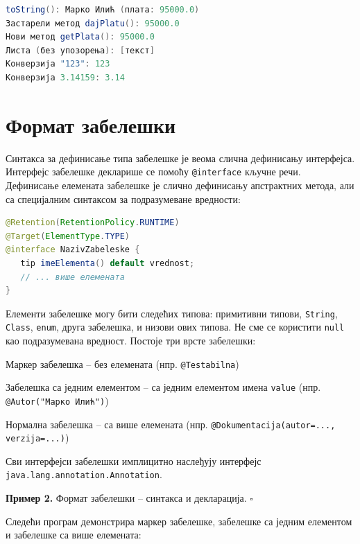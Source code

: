 \begin{lstlisting}[language=Java]
toString(): Марко Илић (плата: 95000.0)
Застарели метод dajPlatu(): 95000.0
Нови метод getPlata(): 95000.0
Листа (без упозорења): [текст]
Конверзија "123": 123
Конверзија 3.14159: 3.14
\end{lstlisting}

\section{Формат забелешки}

Синтакса за дефинисање типа забелешке је веома слична дефинисању интерфејса. Интерфејс забелешке декларише се помоћу \texttt{@interface} кључне речи. Дефинисање елемената забелешке је слично дефинисању апстрактних метода, али са специјалним синтаксом за подразумеване вредности:

\begin{lstlisting}[language=Java]
@Retention(RetentionPolicy.RUNTIME)
@Target(ElementType.TYPE)
@interface NazivZabeleske {
   tip imeElementa() default vrednost;
   // ... више елемената
}
\end{lstlisting}


Елементи забелешке могу бити следећих типова: примитивни типови, \texttt{String}, \texttt{Class}, \texttt{enum}, друга забелешка, и низови ових типова. Не сме се користити \texttt{null} као подразумевана вредност. Постоје три врсте забелешки:

Маркер забелешка – без елемената (нпр. \texttt{@Testabilna})

Забелешка са једним елементом – са једним елементом имена \texttt{value} (нпр. \texttt{@Autor("Марко Илић")})

Нормална забелешка – са више елемената (нпр. \texttt{@Dokumentacija(autor=..., verzija=...)})


Сви интерфејси забелешки имплицитно наслеђују интерфејс \texttt{java.lang.annotation.Annotation}.


\bigskip

\noindent \textbf{Пример 2.} Формат забелешки – синтакса и декларација. $\square$

\medskip

Следећи програм демонстрира маркер забелешке, забелешке са једним елементом и забелешке са више елемената:

